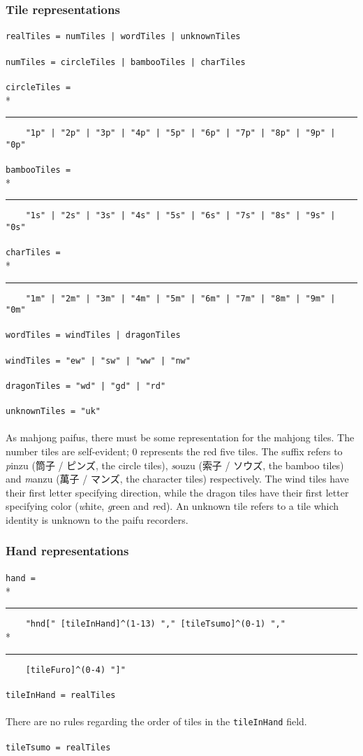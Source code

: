 \documentclass[%
	a4paper%
	,10pt%
	,twoside%
	,notitlepage%
]{article}%
\newcommand*{\ruleSymbol}{\textjapanese{⚠}}%
\newcommand*{\ruleMargin}{\marginpar{\flushright{}\ruleSymbol{}}}%
\newcommand*{\rulePar}{\paragraph*{\ruleMargin{}}}%
\newcommand*{\indentRule}{\rule{10pt}{0pt}}%
\begin{document}
		\subsubsection{Tile representations}\label{subsubsec:tile}%
			\rulePar{}\lstinline/realTiles = numTiles | wordTiles | unknownTiles/%
			\rulePar{}\lstinline/numTiles = circleTiles | bambooTiles | charTiles/%
			\rulePar{}\lstinline/circleTiles = /\\*{}%
			\indentRule{}\lstinline/    "1p" | "2p" | "3p" | "4p" | "5p" | "6p" | "7p" | "8p" | "9p" | "0p"/%
			\rulePar{}\lstinline/bambooTiles = /\\*{}%
			\indentRule{}\lstinline/    "1s" | "2s" | "3s" | "4s" | "5s" | "6s" | "7s" | "8s" | "9s" | "0s"/%
			\rulePar{}\lstinline/charTiles = /\\*{}%
			\indentRule{}\lstinline/    "1m" | "2m" | "3m" | "4m" | "5m" | "6m" | "7m" | "8m" | "9m" | "0m"/%
			\rulePar{}\lstinline/wordTiles = windTiles | dragonTiles/%
			\rulePar{}\lstinline/windTiles = "ew" | "sw" | "ww" | "nw"/%
			\rulePar{}\lstinline/dragonTiles = "wd" | "gd" | "rd"/%
			\rulePar{}\lstinline/unknownTiles = "uk"/%
			\paragraph*{}As mahjong paifus, there must be some representation for the mahjong tiles. The number tiles are self-evident; 0 represents the red five tiles. The suffix refers to \textit{p\/}inzu (\textjapanese{筒子} / \textjapanese{ピンズ}, the circle tiles), \textit{s\/}ouzu (\textjapanese{索子} / \textjapanese{ソウズ}, the bamboo tiles) and \textit{m\/}anzu (\textjapanese{萬子} / \textjapanese{マンズ}, the character tiles) respectively. The wind tiles have their first letter specifying direction, while the dragon tiles have their first letter specifying color (\textit{w\/}hite, \textit{g\/}reen and \textit{r\/}ed). An unknown tile refers to a tile which identity is unknown to the paifu recorders. %
		\subsubsection{Hand representations}\label{subsubsec:hand}%
			\rulePar{}\lstinline/hand = /\\*{}%
			\indentRule{}\lstinline/    "hnd[" [tileInHand]^(1-13) "," [tileTsumo]^(0-1) "," /\\*{}%
			\indentRule{}\lstinline/    [tileFuro]^(0-4) "]"/%
			\rulePar{}\lstinline/tileInHand = realTiles/%
			\rulePar{}There are no rules regarding the order of tiles in the \lstinline/tileInHand/ field. %
			\rulePar{}\lstinline/tileTsumo = realTiles/%
\end{document}
